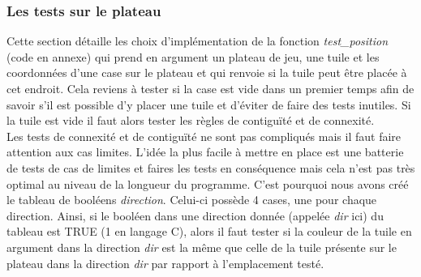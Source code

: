 \documentclass[11pt]{article}
\begin{document}
\subsubsection{Les tests sur le plateau} \label{subsec: tests}
Cette section détaille les choix d'implémentation de la fonction \emph{test\_position} (code en annexe) qui prend en argument un plateau de jeu, une tuile et les coordonnées d'une case sur le plateau et qui renvoie si la tuile peut être placée à cet endroit. Cela reviens à tester si la case est vide dans un premier temps afin de savoir s'il est possible d'y placer une tuile et d'éviter de faire des tests inutiles. Si la tuile est vide il faut alors tester les règles de contiguïté et de connexité. 
\\

Les tests de connexité et de contiguïté ne sont pas compliqués mais il faut faire attention aux cas limites. L'idée la plus facile à mettre en place est une batterie de tests de cas de limites et faires les tests en conséquence mais cela n'est pas très optimal au niveau de la longueur du programme. C'est pourquoi nous avons créé le tableau de booléens \emph{direction}. Celui-ci possède 4 cases, une pour chaque direction. Ainsi, si le booléen dans une direction donnée (appelée \emph{dir} ici) du tableau est TRUE (1 en langage C), alors il faut tester si la couleur de la tuile en argument dans la direction \emph{dir} est la même que celle de la tuile présente sur le plateau dans la direction \emph{dir} par rapport à l'emplacement testé.
\\
\begin{figure}[H] 
\centering
{}
\label{fig: position}
\end{figure}
\end{document}
